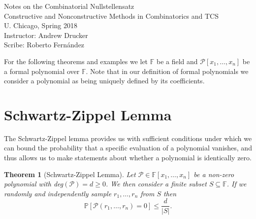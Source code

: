 \documentclass[11pt]{article}
\newtheorem{theorem}{Theorem}
\theoremstyle{definition}
\numberwithin{equation}{subsection}
\begin{document}
\begin{center}
{\Large Notes on the Combinatorial Nullstellensatz} \\\vspace{0.05in}
Constructive and Nonconstructive Methods in Combinatorics and TCS \\
U. Chicago, Spring 2018\\
Instructor: Andrew Drucker\\
Scribe: Roberto Fern\'andez \\
\end{center} 

\begin{comment}
The Combinatorial Nullstellensatz and the Schwartz-Zippel Lemma both give us conditions for when a polynomial has nonzero values $\overline{x}\colon \mathcal{P}(\overline{x})\neq0$. 
\end{comment}

For the following theorems and examples we let $\mathbb{F}$ be a field and $\mathcal{P}[x_1,\ldots,x_n]$ be a formal polynomial over $\mathbb{F}$. Note that in our definition of formal polynomials we consider a polynomial as being uniquely defined by its coefficients.

\section{Schwartz-Zippel Lemma}

The Schwartz-Zippel lemma \cite{Schwartz, Zippel} provides us with sufficient conditions under which we can bound the probability that a specific evaluation of a polynomial vanishes, and thus allows us to make statements about whether a polynomial is identically zero.

\begin{theorem}[Schwartz-Zippel Lemma]
Let $\mathcal{P}\in \mathbb{F}[x_1,\ldots,x_n]$ be a non-zero polynomial with deg$(\mathcal{P})=d\geq 0$. We then consider a finite subset $S\subseteq \mathbb{F}$. If we randomly and independently sample $r_1,\ldots,r_n$ from $S$ then $$\mathbb{P}[\mathcal{P}(r_1,\ldots,r_n)=0]\leq \frac{d}{|S|}.$$
\end{theorem}
\end{document}
